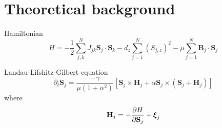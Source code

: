 \section{Theoretical background}

Hamiltonian 
\begin{equation}\label{eq:hamiltionian}
	H = - \frac{1}{2} \sum_{j,k}^{N} J_{jk} \mathbf{S}_j \cdot \mathbf{S}_k - d_z \sum_{j=1}^{N} (S_{j,z})^2 - \mu \sum_{j=1}^{N} \mathbf{B}_j \cdot \mathbf{S}_j
\end{equation}

Landau-Lifshitz-Gilbert equation 
\begin{equation}\label{eq:llg}
	\partial_t \mathbf{S}_j = \frac{-\gamma}{\mu(1 + \alpha^2)} \left[ \mathbf{S}_j \times \mathbf{H}_j + \alpha \mathbf{S}_j \times (\mathbf{S}_j + \mathbf{H}_j) \right]
\end{equation}
where
\begin{equation}\label{eq:ef_field}
	\mathbf{H}_j = -\frac{\partial H}{\partial \mathbf{S}_j} + \boldsymbol{\xi}_j
\end{equation}